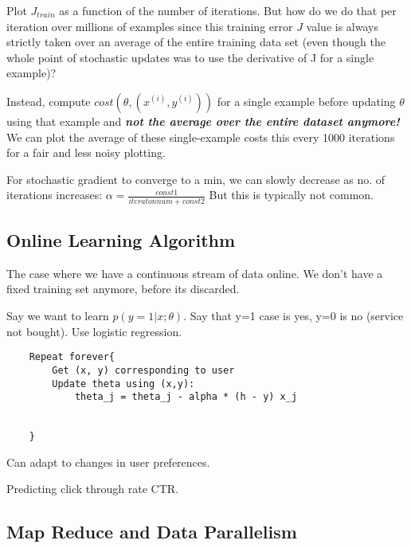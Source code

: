 \documentclass{article}
\begin{document}
\begin{myboxr}
Plot $J_{train}$ as a function of the number of iterations. But how do we do that per iteration over millions of examples since this training error $J$ value is always strictly taken over an average of the entire training data set (even though the whole point of stochastic updates was to use the derivative of J for a single example)?
\end{myboxr}



\begin{mybox}
Instead, compute $cost(\theta, (x^{(i)}, y^{(i)}))$ for a single example before updating $\theta$ using that example and \textbf{\textit{not the average over the \textit{entire} dataset anymore!}} We can plot the average of these single-example costs this every 1000 iterations for a fair and less noisy plotting.
\end{mybox}



For stochastic gradient to converge to a min, we can slowly decrease as no. of iterations increases: $\alpha = \frac{const1}{iteraton num + const2}$ But this is typically not common. 



\subsection{Online Learning Algorithm}

The case where we have a continuous stream of data online. We don't have a fixed training set anymore, before its discarded.

Say we want to learn $p(y = 1 \vert x; \theta)$. Say that y=1 case is yes, y=0 is no (service not bought). Use logistic regression.

\begin{verbatim}
    Repeat forever{
        Get (x, y) corresponding to user
        Update theta using (x,y):
            theta_j = theta_j - alpha * (h - y) x_j
    
    
    }
\end{verbatim}

Can adapt to changes in user preferences.


Predicting click through rate CTR.




\subsection{Map Reduce and Data Parallelism}
\end{document}
